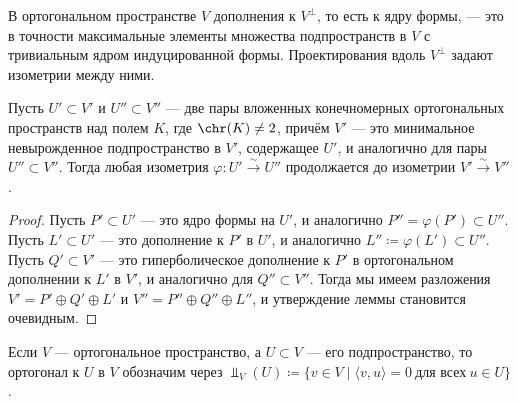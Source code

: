 \documentclass[
	extrafontsizes,
	11pt,
	hyphens,
]{memoir}
\begin{document}
\begin{observation}
В ортогональном пространстве \(V\) дополнения к \(V^\perp\), то есть к ядру формы, --- это в точности максимальные элементы множества подпространств в \(V\) с тривиальным ядром индуцированной формы.
\label{obs:ort_ker_compl}
Проектирования вдоль \(V^\perp\) задают изометрии между ними.
\end{observation}


\begin{lemma}
Пусть \(U' \subset V'\) и \(U'' \subset V''\) --- две пары вложенных конечномерных ортогональных пространств над полем \(K\), где \(\chr(K) \neq 2\), причём \(V'\) --- это минимальное невырожденное подпространство в \(V'\), содержащее \(U'\), и аналогично для пары \(U'' \subset V''\).
Тогда любая изометрия  \(\varphi : U' \xrightarrow{\sim} U''\) продолжается до изометрии \(V' \xrightarrow{\sim} V''\).
\end{lemma}

\begin{proof}
Пусть \(P' \subset U'\) --- это ядро формы на \(U'\), и аналогично \(P'' = \varphi(P') \subset U''\).
Пусть \(L' \subset U'\) --- это дополнение к \(P'\) в \(U'\), и аналогично \(L'' \coloneqq \varphi(L') \subset U''\).
Пусть \(Q' \subset V'\) --- это гиперболическое дополнение к \(P'\) в ортогональном дополнении к \(L'\) в \(V'\), и аналогично для \(Q'' \subset V''\).
Тогда мы имеем разложения
\(
V' = P' \oplus Q' \oplus L'
\)
и
\(
V'' = P'' \oplus Q'' \oplus L''
\),
и утверждение леммы становится очевидным.
\end{proof}

\begin{notation}
Если \(V\) --- ортогональное пространство, а \(U \subset V\) --- его подпространство, то ортогонал к \(U\) в \(V\) обозначим через \(\Perp_V(U) \coloneqq \{v \in V \mid \langle v, u \rangle = 0\ \text{для всех}\ u \in U\}\).
\end{notation}
\end{document}

